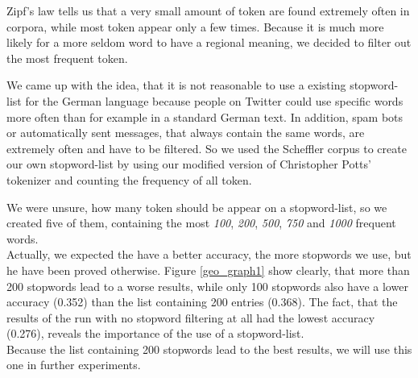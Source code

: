 \documentclass[../Main.tex]{subfiles}
\begin{document}
Zipf's law tells us that a very small amount of token are found extremely often in corpora, while most token appear only a few times. Because it is much more likely for a more seldom word to have a regional meaning, we decided to filter out the most frequent token. 

We came up with the idea, that it is not reasonable to use a existing stopword-list for the German language because people on Twitter could use specific words more often than for example in a standard German text. In addition, spam bots or automatically sent messages, that always contain the same words, are extremely often and  have to be filtered. So we used the Scheffler corpus to create our own stopword-list by using our modified version of Christopher Potts' tokenizer and counting the frequency of all token.

We were unsure, how many token should be appear on a stopword-list, so we created five of them, containing the most \emph{100}, \emph{200}, \emph{500}, \emph{750} and \emph{1000} frequent words.\\
Actually, we expected the have a better accuracy, the more stopwords we use, but he have been proved otherwise. 
Figure \ref{geo_graph1} show clearly, that more than 200 stopwords lead to a worse results, while only 100 stopwords also have a lower accuracy (0.352) than the list containing 200 entries (0.368). The fact, that the results of the run with no stopword filtering at all had the lowest accuracy (0.276), reveals the importance of the use of a stopword-list.\\
Because the list containing 200 stopwords lead to the best results, we will use this one in further experiments.
\end{document}
